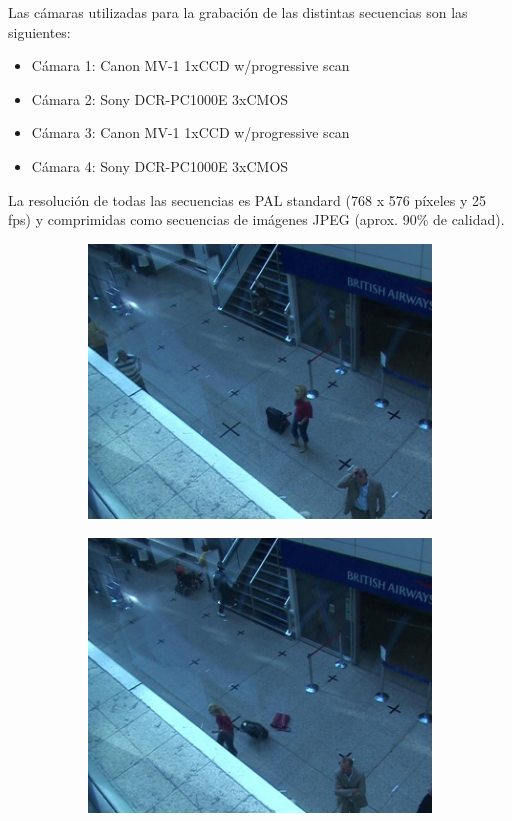 Las cámaras utilizadas para la grabación de las distintas secuencias son las siguientes:

\begin{itemize}
    \item Cámara 1: Canon MV-1 1xCCD w/progressive scan
    \item Cámara 2: Sony DCR-PC1000E 3xCMOS
    \item Cámara 3: Canon MV-1 1xCCD w/progressive scan
    \item Cámara 4: Sony DCR-PC1000E 3xCMOS
\end{itemize}


La resolución de todas las secuencias es PAL standard (768 x 576 píxeles y 25 \gls{fps}) y comprimidas como secuencias de imágenes JPEG (aprox. 90\% de calidad).

\begin{figure}[ht]
  \centering
  \begin{subfigure}[b]{0.4\textwidth}
    \includegraphics[width=\textwidth]{img/chapters/resultados/datasets/pets2007_3.jpg}
    \caption{}
    \label{fig:pets2007_3}
  \end{subfigure}
  \qquad\qquad
  \begin{subfigure}[b]{0.4\textwidth}
    \includegraphics[width=\textwidth]{img/chapters/resultados/datasets/pets2007_4.jpg}

\end{subfigure}
\end{figure}
